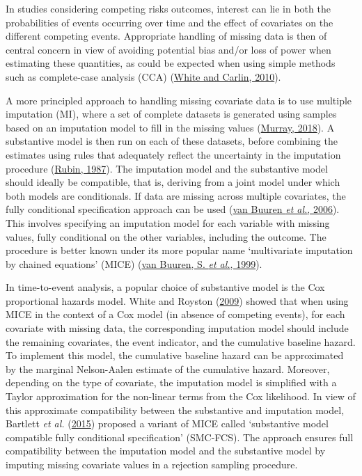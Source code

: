\documentclass[
  letterpaper,
  DIV=11,
  numbers=noendperiod]{scrreprt}
\begin{document}
In studies considering competing risks outcomes, interest can lie in
both the probabilities of events occurring over time and the effect of
covariates on the different competing events. Appropriate handling of
missing data is then of central concern in view of avoiding potential
bias and/or loss of power when estimating these quantities, as could be
expected when using simple methods such as complete-case analysis (CCA)
(\protect\hyperlink{ref-whiteBiasEfficiencyMultiple2010}{White and
Carlin, 2010}).

A more principled approach to handling missing covariate data is to use
multiple imputation (MI), where a set of complete datasets is generated
using samples based on an imputation model to fill in the missing values
(\protect\hyperlink{ref-murrayMultipleImputationReview2018}{Murray,
2018}). A substantive model is then run on each of these datasets,
before combining the estimates using rules that adequately reflect the
uncertainty in the imputation procedure
(\protect\hyperlink{ref-rubin:1987}{Rubin, 1987}). The imputation model
and the substantive model should ideally be compatible, that is,
deriving from a joint model under which both models are conditionals. If
data are missing across multiple covariates, the fully conditional
specification approach can be used
(\protect\hyperlink{ref-vanbuurenFullyConditionalSpecification2006}{van
Buuren \emph{et al.}, 2006}). This involves specifying an imputation
model for each variable with missing values, fully conditional on the
other variables, including the outcome. The procedure is better known
under its more popular name `multivariate imputation by chained
equations' (MICE)
(\protect\hyperlink{ref-vanbuurens.FlexibleMultivariateImputation1999}{van
Buuren, S. \emph{et al.}, 1999}).

In time-to-event analysis, a popular choice of substantive model is the
Cox proportional hazards model. White and Royston
(\protect\hyperlink{ref-whiteImputingMissingCovariate2009}{2009}) showed
that when using MICE in the context of a Cox model (in absence of
competing events), for each covariate with missing data, the
corresponding imputation model should include the remaining covariates,
the event indicator, and the cumulative baseline hazard. To implement
this model, the cumulative baseline hazard can be approximated by the
marginal Nelson-Aalen estimate of the cumulative hazard. Moreover,
depending on the type of covariate, the imputation model is simplified
with a Taylor approximation for the non-linear terms from the Cox
likelihood. In view of this approximate compatibility between the
substantive and imputation model, Bartlett \emph{et al.}
(\protect\hyperlink{ref-bartlettMultipleImputationCovariates2015}{2015})
proposed a variant of MICE called `substantive model compatible fully
conditional specification' (SMC-FCS). The approach ensures full
compatibility between the imputation model and the substantive model by
imputing missing covariate values in a rejection sampling procedure.
\end{document}
